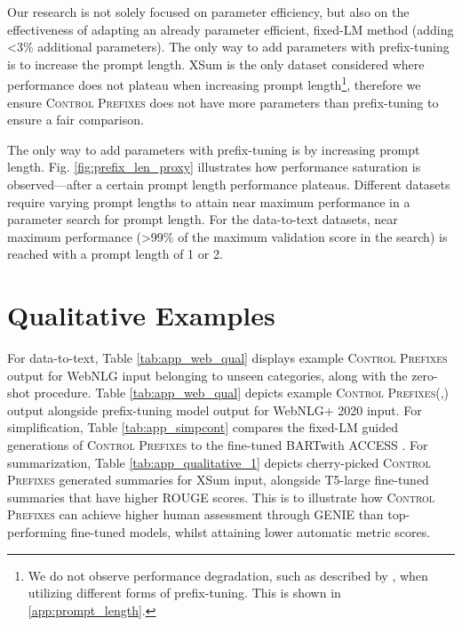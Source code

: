 \documentclass[11pt]{article}
\newcommand{\control}{\textsc{Control Prefixes}\xspace}
\newcommand{\bartl}{BART}
\begin{document}
\FloatBarrier


Our research is not solely focused on parameter efficiency, but also on the effectiveness of adapting an already parameter efficient, fixed-LM method (adding <3\% additional parameters). The only way to add parameters with prefix-tuning is to increase the prompt length. XSum is the only dataset considered where performance does not plateau when increasing prompt length\footnote{We do not observe performance degradation, such as described by \citet{lora}, when utilizing different forms of prefix-tuning. This is shown in  \ref{app:prompt_length}.}, therefore we ensure \control does not have more parameters than prefix-tuning to ensure a fair comparison. 

The only way to add parameters with prefix-tuning is by increasing prompt length. Fig. \ref{fig:prefix_len_proxy} illustrates how performance saturation is observed—after a certain prompt length performance plateaus. Different datasets require varying prompt lengths to attain near maximum performance in a parameter search for prompt length. For the data-to-text datasets, near maximum performance (>99\% of the maximum validation score in the search) is reached with a prompt length of 1 or 2. 

\section{Qualitative Examples}
\label{app:qual}
For data-to-text, Table \ref{tab:app_web_qual} displays example \control output for WebNLG input belonging to unseen categories, along with the zero-shot procedure. Table \ref{tab:app_web_qual} depicts example \control (,) output alongside prefix-tuning model output for WebNLG+ 2020 input. For simplification, Table \ref{tab:app_simpcont} compares the fixed-LM guided generations of \control to the fine-tuned \bartl with ACCESS \citep{MUSS}. For summarization, Table \ref{tab:app_qualitative_1} depicts cherry-picked \control generated summaries for XSum input, alongside T5-large fine-tuned summaries that have higher ROUGE scores. This is to illustrate how \control can achieve higher human assessment through GENIE than top-performing fine-tuned models, whilst attaining lower automatic metric scores.






\FloatBarrier
\end{document}

